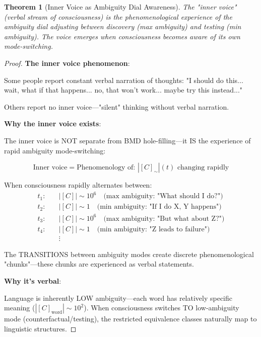 \documentclass[11pt,a4paper]{article}
\newtheorem{theorem}{Theorem}
\begin{document}
\begin{theorem}[Inner Voice as Ambiguity Dial Awareness]
\label{thm:inner_voice}
The "inner voice" (verbal stream of consciousness) is the phenomenological experience of the ambiguity dial adjusting between discovery (max ambiguity) and testing (min ambiguity). The voice emerges when consciousness becomes aware of its own mode-switching.
\end{theorem}

\begin{proof}
\textbf{The inner voice phenomenon}:

Some people report constant verbal narration of thoughts: "I should do this... wait, what if that happens... no, that won't work... maybe try this instead..."

Others report no inner voice—"silent" thinking without verbal narration.

\textbf{Why the inner voice exists}:

The inner voice is NOT separate from BMD hole-filling—it IS the experience of rapid ambiguity mode-switching:

\begin{equation}
\text{Inner voice} = \text{Phenomenology of: } |[C]_{\sim}|(t) \text{ changing rapidly}
\end{equation}

When consciousness rapidly alternates between:
\begin{align}
t_1: \quad &|[C]| \sim 10^6 \quad \text{(max ambiguity: "What should I do?")} \\
t_2: \quad &|[C]| \sim 1 \quad \text{(min ambiguity: "If I do X, Y happens")} \\
t_3: \quad &|[C]| \sim 10^6 \quad \text{(max ambiguity: "But what about Z?")} \\
t_4: \quad &|[C]| \sim 1 \quad \text{(min ambiguity: "Z leads to failure")} \\
&\vdots
\end{align}

The TRANSITIONS between ambiguity modes create discrete phenomenological "chunks"—these chunks are experienced as verbal statements.

\textbf{Why it's verbal}:

Language is inherently LOW ambiguity—each word has relatively specific meaning ($|[C]_{\text{word}}| \sim 10^2$). When consciousness switches TO low-ambiguity mode (counterfactual/testing), the restricted equivalence classes naturally map to linguistic structures.


\end{proof}
\end{document}
